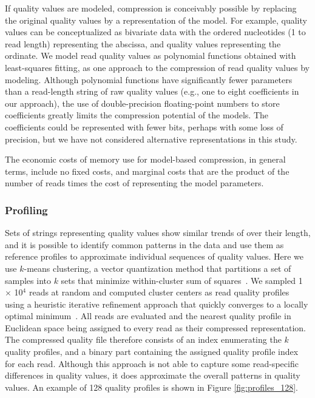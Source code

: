 \documentclass{bioinfo}
\begin{document}
\begin{methods}
If quality values are modeled, compression is conceivably possible by
replacing the original quality values by a representation of the
model. For example, quality values can be conceptualized as bivariate
data with the ordered nucleotides (1 to read length) representing the
abscissa, and quality values representing the ordinate. We model read
quality values as polynomial functions obtained with least-squares
fitting, as one approach to the compression of read quality values by
modeling. Although polynomial functions have significantly fewer
parameters than a read-length string of raw quality values (e.g., one
to eight coefficients in our approach), the use of double-precision floating-point
numbers to store coefficients greatly limits the compression potential
of the models. The coefficients could be represented with fewer bits,
perhaps with some loss of precision, but we have not considered
alternative representations in this study.

The economic costs of memory use for model-based compression, in
general terms, include no fixed costs, and marginal costs that are the
product of the number of reads times the cost of representing the
model parameters.

\subsubsection{Profiling}

Sets of strings representing quality values show similar trends of
over their length, and it is possible to identify common patterns in
the data and use them as reference profiles to approximate individual
sequences of quality values. Here we use $k$-means clustering, a
vector quantization method that partitions a set of samples into $k$
sets that minimize within-cluster sum of
squares~\citep{macqueen1967some}. We sampled 1 $\times$ 10$^{4}$ reads
at random and computed cluster centers as read quality profiles using
a heuristic iterative refinement approach that quickly converges to a
locally optimal minimum~\citep{hartigan1979algorithm}. All reads are
evaluated and the nearest quality profile in Euclidean space being
assigned to every read as their compressed representation.  The
compressed quality file therefore consists of an index enumerating the
$k$ quality profiles, and a binary part containing the assigned
quality profile index for each read.  Although this approach is not
able to capture some read-specific differences in quality values, it
does approximate the overall patterns in quality values. An example of
128 quality profiles is shown in Figure \ref{fig:profiles_128}.


\end{methods}
\end{document}

